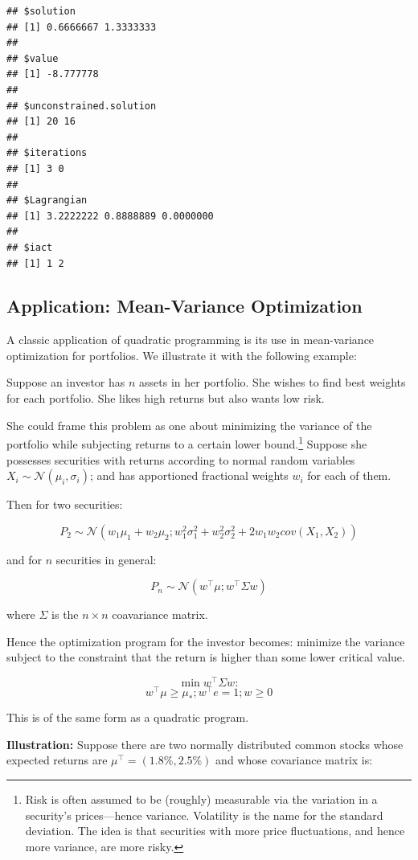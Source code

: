 \documentclass[11pt,]{article}
\let\rmarkdownfootnote\footnote%
\def\footnote{\protect\rmarkdownfootnote}
\begin{document}
\begin{verbatim}
## $solution
## [1] 0.6666667 1.3333333
## 
## $value
## [1] -8.777778
## 
## $unconstrained.solution
## [1] 20 16
## 
## $iterations
## [1] 3 0
## 
## $Lagrangian
## [1] 3.2222222 0.8888889 0.0000000
## 
## $iact
## [1] 1 2
\end{verbatim}

\subsection{Application: Mean-Variance
Optimization}\label{application-mean-variance-optimization}

A classic application of quadratic programming is its use in
mean-variance optimization for portfolios. We illustrate it with the
following example:

Suppose an investor has \(n\) assets in her portfolio. She wishes to
find best weights for each portfolio. She likes high returns but also
wants low risk.

She could frame this problem as one about minimizing the variance of the
portfolio while subjecting returns to a certain lower bound.\footnote{Risk
  is often assumed to be (roughly) measurable via the variation in a
  security's prices---hence variance. Volatility is the name for the
  standard deviation. The idea is that securities with more price
  fluctuations, and hence more variance, are more risky.} Suppose she
possesses securities with returns according to normal random variables
\(X_i\sim \mathcal{N}(\mu_i, \sigma_i)\); and has apportioned fractional
weights \(w_i\) for each of them.

Then for two securities:

\[P_2 \sim \mathcal{N}(w_1\mu_1+w_2\mu_2; w_1^2\sigma_1^2+w_2^2\sigma_2^2+2w_1w_2cov(X_1,X_2))\]

and for \(n\) securities in general:

\[P_n \sim \mathcal{N}(w^{\top}\mu; w^{\top}\Sigma w)\]

where \(\Sigma\) is the \(n\times n\) coavariance matrix.

Hence the optimization program for the investor becomes: minimize the
variance subject to the constraint that the return is higher than some
lower critical value.

\[\min{} w^{\top}\Sigma w:\]
\[w^{\top}\mu \geq \mu_*; w^{\top}e = 1; w\geq 0\]

This is of the same form as a quadratic program.

\textbf{Illustration:} Suppose there are two normally distributed common
stocks whose expected returns are \(\mu^{\top} = (1.8\%, 2.5\%)\) and
whose covariance matrix is:
\end{document}
